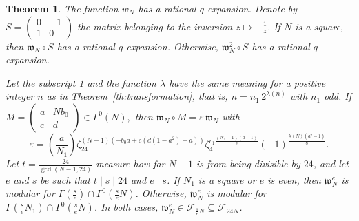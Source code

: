 \documentclass[12pt,twoside,leqno]{article}
\newtheorem{theorem}{Theorem}[section]
\numberwithin{equation}{section}
\newcommand{\legendre}[2]{\genfrac {(}{)}{1pt}{}{#1}{#2}}
\newcommand{\w}{\mathfrak w}
\newcommand{\F}{\mathcal F}
\begin{document}
\begin {theorem}
\label {th:F24N}
The function $w_N$ has a rational $q$-expansion.
Denote by $S = \begin
{pmatrix} 0 & -1 \\ 1 & 0 \end {pmatrix}$ the matrix belonging to the
inversion $z \mapsto - \frac {1}{z}$. If $N$ is a square, then $\w_N \circ S$
has a rational $q$-expansion. Otherwise, $\w_N^2 \circ S$ has a rational
$q$-expansion.

Let the subscript 1 and the function $\lambda$ have the same
meaning for a positive integer $n$ as in Theorem~\ref {th:transformation},
that is, $n = n_1 \, 2^{\lambda (n)}$ with $n_1$ odd.
If $M = \begin {pmatrix} a & N b_0 \\ c & d \end {pmatrix}
\in \Gamma^0 (N),$
then $\w_N \circ M = \varepsilon \, \w_N$ with
\begin {equation}
\label {eq:epsilon}
\varepsilon =
\legendre {a}{N_1} \zeta_{24}^{(N - 1) (-b_0 a + c (d (1 - a^2)
- a))} \zeta_4^{c_1 \frac {(N_1 - 1)(a - 1)}{2}} (-1)^{\frac {\lambda (N)
(a^2 - 1)}{8}}.
\end {equation}
Let $t = \frac {24}{\gcd (N - 1, 24)}$ measure how far $N-1$ is from
being divisible by $24$, and let $e$ and $s$ be such that
$t \mid s \mid 24$ and $e \mid s$.
If $N_1$ is a square or $e$ is even, then
$\w_N^e$ is modular for $\Gamma \left( \frac {s}{e} \right)
\cap \Gamma^0 \left( \frac {s}{e} N \right)$.
Otherwise, $\w_N^e$ is modular for $\Gamma \left( \frac {s}{e} N_1 \right)
\cap \Gamma^0 \left( \frac {s}{e} N \right)$.
In both cases, $\w_N^e \in \F_{\frac {s}{e} N} \subseteq \F_{24 N}$.
\end {theorem}
\end{document}
